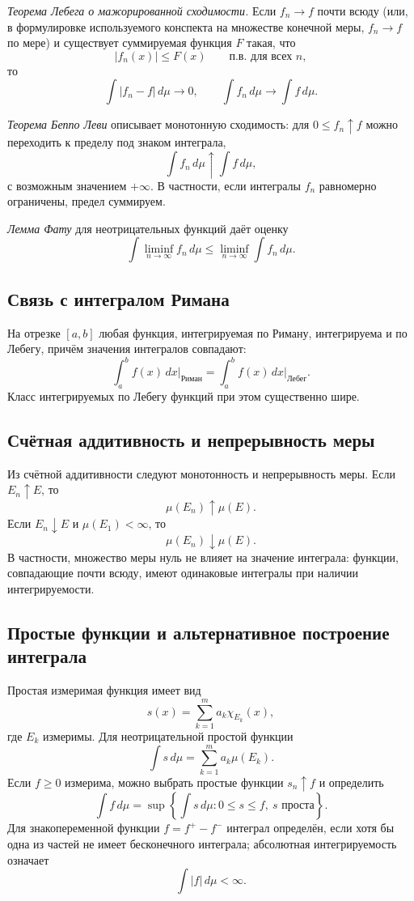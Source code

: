 \emph{Теорема Лебега о мажорированной сходимости.} Если $f_n\to f$ почти всюду
(или, в формулировке используемого конспекта на множестве конечной меры,
$f_n\to f$ по мере) и существует суммируемая функция $F$ такая, что
\[
    |f_n(x)|\leq F(x)\qquad\text{п.в. для всех }n,
\]
то
\[
    \int |f_n-f|\,d\mu\to0,
    \qquad
    \int f_n\,d\mu\to\int f\,d\mu.
\]

\emph{Теорема Беппо Леви} описывает монотонную сходимость: для
$0\leq f_n\uparrow f$ можно переходить к пределу под знаком интеграла,
\[
    \int f_n\,d\mu\uparrow\int f\,d\mu,
\]
с возможным значением $+\infty$. В частности, если интегралы $f_n$ равномерно
ограничены, предел суммируем.

\emph{Лемма Фату} для неотрицательных функций даёт оценку
\[
    \int \liminf_{n\to\infty}f_n\,d\mu
    \leq
    \liminf_{n\to\infty}\int f_n\,d\mu.
\]

\subsection{Связь с интегралом Римана}

На отрезке $[a,b]$ любая функция, интегрируемая по Риману, интегрируема и по
Лебегу, причём значения интегралов совпадают:
\[
    \int_a^b f(x)\,dx\bigg|_{\text{Риман}}
    =
    \int_a^b f(x)\,dx\bigg|_{\text{Лебег}}.
\]
Класс интегрируемых по Лебегу функций при этом существенно шире.


\subsection{Счётная аддитивность и непрерывность меры}

Из счётной аддитивности следуют монотонность и непрерывность меры. Если
$E_n\uparrow E$, то
\[
    \mu(E_n)\uparrow\mu(E).
\]
Если $E_n\downarrow E$ и $\mu(E_1)<\infty$, то
\[
    \mu(E_n)\downarrow\mu(E).
\]
В частности, множество меры нуль не влияет на значение интеграла: функции,
совпадающие почти всюду, имеют одинаковые интегралы при наличии интегрируемости.

\subsection{Простые функции и альтернативное построение интеграла}

Простая измеримая функция имеет вид
\[
    s(x)=\sum_{k=1}^m a_k\chi_{E_k}(x),
\]
где $E_k$ измеримы. Для неотрицательной простой функции
\[
    \int s\,d\mu=\sum_{k=1}^m a_k\mu(E_k).
\]
Если $f\ge0$ измерима, можно выбрать простые функции $s_n\uparrow f$ и определить
\[
    \int f\,d\mu=\sup\left\{\int s\,d\mu:0\le s\le f,\ s\text{ проста}\right\}.
\]
Для знакопеременной функции $f=f^+-f^-$ интеграл определён, если хотя бы одна из
частей не имеет бесконечного интеграла; абсолютная интегрируемость означает
\[
    \int |f|\,d\mu<\infty.
\]

